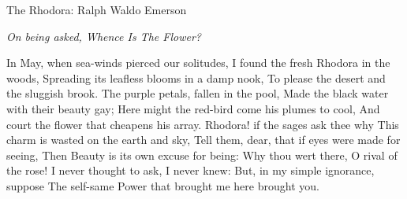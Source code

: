 The Rhodora:
Ralph Waldo Emerson

\emph{On being asked, Whence Is The Flower?}

In May, when sea-winds pierced our solitudes,
I found the fresh Rhodora in the woods,
Spreading its leafless blooms in a damp nook,
To please the desert and the sluggish brook.
The purple petals, fallen in the pool,
Made the black water with their beauty gay;
Here might the red-bird come his plumes to cool,
And court the flower that cheapens his array.
Rhodora! if the sages ask thee why
This charm is wasted on the earth and sky,
Tell them, dear, that if eyes were made for seeing,
Then Beauty is its own excuse for being:
Why thou wert there, O rival of the rose!
I never thought to ask, I never knew:
But, in my simple ignorance, suppose
The self-same Power that brought me here brought you.
